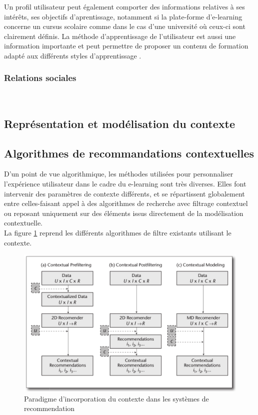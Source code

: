 \documentclass[conference]{./sty/IEEEtran}
\begin{document}
Un profil utilisateur peut également comporter des informations relatives à ses
intérêts, ses objectifs d'aprentissage, notamment si la plate-forme
d'e-learning concerne un cursus scolaire comme dans le cas d'une université où
ceux-ci sont clairement définis. La méthode d'apprentissage de l'utilisateur
est aussi une information importante et peut permettre de proposer un contenu
de formation adapté aux différents styles d'apprentissage
\cite{smartECourseRecommander}. \\

\subsubsection{Relations sociales}
~\\

\subsection{Représentation et modélisation du contexte}

\subsection{Algorithmes de recommandations contextuelles}

D'un point de vue algorithmique, les méthodes utilisées pour personnaliser
l'expérience utilisateur dans le cadre du e-learning sont très diverses. Elles
font intervenir des paramètres de contexte différents, et se répartissent
globalement entre celles-faisant appel à des algorithmes de recherche avec
filtrage contextuel ou reposant uniquement sur des éléments issus directement
de la modélisation contextuelle. \\

La figure \ref{fig:algos} reprend les différents algorithmes de filtre
existants utilisant le contexte. \\

\begin{figure}[tb]
  \centering
  \caption{\label{fig:algos} Paradigme d'incorporation du contexte dans les systèmes de recommendation \cite{DBLP:journals/aim/AdomaviciusMRT11}}
  \includegraphics[width=\textwidth]{algo}
\end{figure}
\end{document}

